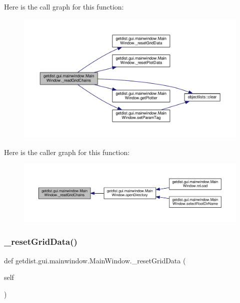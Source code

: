 Here is the call graph for this function\+:
\nopagebreak
\begin{figure}[H]
\begin{center}
\leavevmode
\includegraphics[width=350pt]{classgetdist_1_1gui_1_1mainwindow_1_1MainWindow_a8e87ee33947bf720fec739d5de9dd99c_cgraph}
\end{center}
\end{figure}
Here is the caller graph for this function\+:
\nopagebreak
\begin{figure}[H]
\begin{center}
\leavevmode
\includegraphics[width=350pt]{classgetdist_1_1gui_1_1mainwindow_1_1MainWindow_a8e87ee33947bf720fec739d5de9dd99c_icgraph}
\end{center}
\end{figure}
\mbox{\label{classgetdist_1_1gui_1_1mainwindow_1_1MainWindow_aa66e5484958005c6d6dfd988a05ac83a}} 
\subsubsection{\texorpdfstring{\+\_\+reset\+Grid\+Data()}{\_resetGridData()}}
{\footnotesize\ttfamily def getdist.\+gui.\+mainwindow.\+Main\+Window.\+\_\+reset\+Grid\+Data (\begin{DoxyParamCaption}\item[{}]{self }\end{DoxyParamCaption})\hspace{0.3cm}{\ttfamily [private]}}



